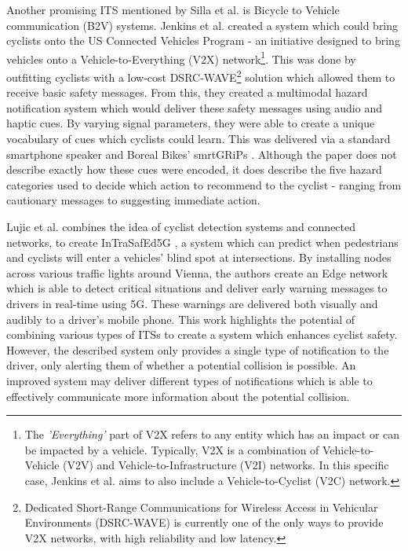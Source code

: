 \documentclass{mpaper}
\begin{document}
Another promising ITS mentioned by Silla et al. \cite{SILLA2017134} is Bicycle to Vehicle communication (B2V) systems. Jenkins et al. created a system which could bring cyclists onto the US Connected Vehicles Program \cite{usdot} - an initiative designed to bring vehicles onto a Vehicle-to-Everything (V2X) network\footnote{The \textit{'Everything'} part of V2X refers to any entity which has an impact or can be impacted by a vehicle. Typically, V2X is a combination of Vehicle-to-Vehicle (V2V) and Vehicle-to-Infrastructure (V2I) networks. In this specific case, Jenkins et al. aims to also include a Vehicle-to-Cyclist (V2C) network.}. This was done by outfitting cyclists with a low-cost DSRC-WAVE\footnote{Dedicated Short-Range Communications for Wireless Access in Vehicular Environments (DSRC-WAVE) is currently one of the only ways to provide V2X networks, with high reliability and low latency.} solution which allowed them to receive basic safety messages. From this, they created a multimodal hazard notification system which would deliver these safety messages using audio and haptic cues. By varying signal parameters, they were able to create a unique vocabulary of cues which cyclists could learn. This was delivered via a standard smartphone speaker and Boreal Bikes’ smrtGRiPs \cite{smartgrips}. Although the paper does not describe exactly how these cues were encoded, it does describe the five hazard categories used to decide which action to recommend to the cyclist - ranging from cautionary messages to suggesting immediate action.

Lujic et al. combines the idea of cyclist detection systems and connected networks, to create InTraSafEd5G \cite{10.1145/3434770.3459732}, a system which can predict when pedestrians and cyclists will enter a vehicles' blind spot at intersections. By installing nodes across various traffic lights around Vienna, the authors create an Edge network which is able to detect critical situations and deliver early warning messages to drivers in real-time using 5G. These warnings are delivered both visually and audibly to a driver’s mobile phone. This work highlights the potential of combining various types of ITSs to create a system which enhances cyclist safety. However, the described system only provides a single type of notification to the driver, only alerting them of whether a potential collision is possible. An improved system may deliver different types of notifications which is able to effectively communicate more information about the potential collision.
\end{document}
